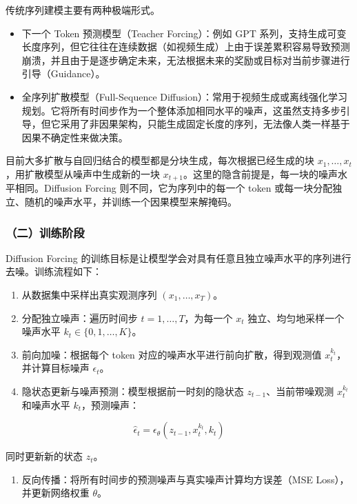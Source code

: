 传统序列建模主要有两种极端形式。

\begin{itemize}
\tightlist
\item
  下一个 Token 预测模型（Teacher Forcing）：例如 GPT 系列，支持生成可变长度序列，但它往往在连续数据（如视频生成）上由于误差累积容易导致预测崩溃，并且由于是逐步确定未来，无法根据未来的奖励或目标对当前步骤进行引导（Guidance）。
\item
  全序列扩散模型（Full-Sequence Diffusion）：常用于视频生成或离线强化学习规划。它将所有时间步作为一个整体添加相同水平的噪声，这虽然支持多步引导，但它采用了非因果架构，只能生成固定长度的序列，无法像人类一样基于因果不确定性来做决策。
\end{itemize}

目前大多扩散与自回归结合的模型都是分块生成，每次根据已经生成的块 \(x_1,\ldots,x_t\)，用扩散模型从噪声中生成新的一块 \(x_{t+1}\)。这里的隐含前提是，每一块的噪声水平相同。Diffusion Forcing 则不同，它为序列中的每一个 token 或每一块分配独立、随机的噪声水平，并训练一个因果模型来解掩码。

\hypertarget{ux4e8cux8badux7ec3ux9636ux6bb5}{%
\subsubsection{（二）训练阶段}\label{ux4e8cux8badux7ec3ux9636ux6bb5}}

Diffusion Forcing 的训练目标是让模型学会对具有任意且独立噪声水平的序列进行去噪。训练流程如下：

\begin{enumerate}
\def\labelenumi{\arabic{enumi}.}
\tightlist
\item
  从数据集中采样出真实观测序列 \((x_1,\ldots,x_T)\)。
\item
  分配独立噪声：遍历时间步 \(t=1,\ldots,T\)，为每一个 \(x_t\) 独立、均匀地采样一个噪声水平 \(k_t\in\{0,1,\ldots,K\}\)。
\item
  前向加噪：根据每个 token 对应的噪声水平进行前向扩散，得到观测值 \(x_t^{k_t}\)，并计算目标噪声 \(\epsilon_t\)。
\item
  隐状态更新与噪声预测：模型根据前一时刻的隐状态 \(z_{t-1}\)、当前带噪观测 \(x_t^{k_t}\) 和噪声水平 \(k_t\)，预测噪声：
\end{enumerate}

\[
\hat{\epsilon}_t=\epsilon_\theta(z_{t-1},x_t^{k_t},k_t)
\]

同时更新新的状态 \(z_t\)。

\begin{enumerate}
\def\labelenumi{\arabic{enumi}.}
\setcounter{enumi}{4}
\tightlist
\item
  反向传播：将所有时间步的预测噪声与真实噪声计算均方误差（MSE Loss），并更新网络权重 \(\theta\)。
\end{enumerate}

